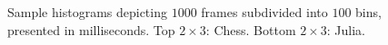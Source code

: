 \begin{figure}
  \setlength{\abovecaptionskip}{0pt}
  \setlength{\belowcaptionskip}{0pt}
  \centering
  
  
  \caption{Sample histograms depicting $1000$ frames subdivided into $100$ bins, presented in milliseconds. Top $2\times3$: Chess. Bottom $2\times3$: Julia.}
  \label{fig:histogram}
\end{figure}
